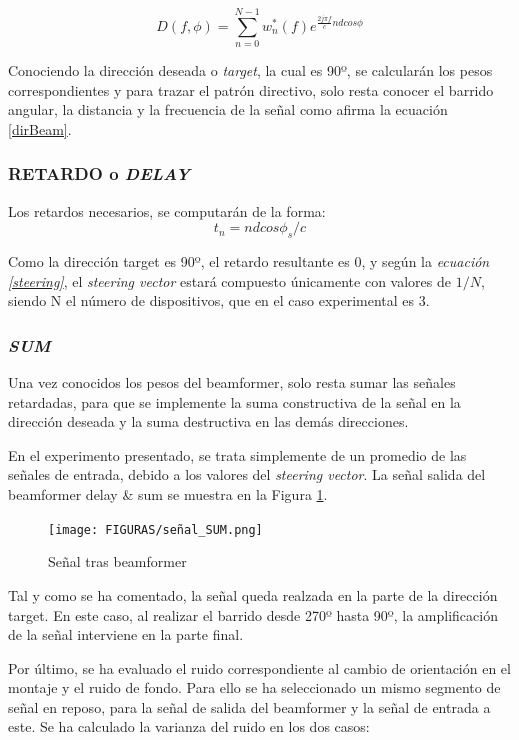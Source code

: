 \documentclass[a4paper,11pt]{book}
\begin{document}
	\begin{equation}
	 D(f, \phi) = \sum_{n = 0}^{N-1}w^{*}_{n}(f)e^{\frac{2j \pi f}{c} n d cos\phi}
	 \label{DirBeam}
	\end{equation}

Conociendo la dirección deseada o \textit{target}, la cual es 90º, se calcularán los pesos correspondientes y para trazar el patrón directivo, solo resta conocer el barrido angular, la distancia y la frecuencia de la señal como afirma la ecuación \ref{dirBeam}.

\subsubsection{RETARDO o \textit{DELAY}}
Los retardos necesarios, se computarán de la forma:
\begin{equation}
t_{n} = n d cos\phi_{s} / c
\end{equation}

Como la dirección target es 90º, el retardo resultante es 0, y según la \textit{ecuación \ref{steering}}, el \textit{steering vector} estará compuesto únicamente con valores de $1/N$, siendo N el número de dispositivos, que en el caso experimental es 3.

\subsubsection{\textit{SUM}}
Una vez conocidos los pesos del beamformer, solo resta sumar las señales retardadas, para que se implemente la suma constructiva de la señal en la dirección deseada y la suma destructiva en las demás direcciones.

En el experimento presentado, se trata simplemente de un promedio de las señales de entrada, debido a los valores del \textit{steering vector}. La señal salida del beamformer delay \& sum se muestra en la Figura \ref{sum}.

\begin{figure}[hbtp]
\centering
\texttt{[image: FIGURAS/señal\_SUM.png]}
\caption{Señal tras beamformer}
\label{sum}
\end{figure}

Tal y como se ha comentado, la señal queda realzada en la parte de la dirección target. En este caso, al realizar el barrido desde 270º hasta 90º, la amplificación de la señal interviene en la parte final.

Por último, se ha evaluado el ruido correspondiente al cambio de orientación en el montaje y el ruido de fondo. Para ello se ha seleccionado un mismo segmento de señal en reposo, para la señal de salida del beamformer y la señal de entrada a este. Se ha calculado la varianza del ruido en los dos casos:
\linebreak
\end{document}
